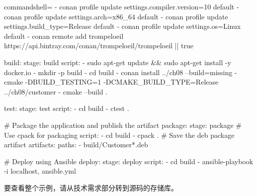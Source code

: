 \begin{tcblisting}{commandshell={}}
    - conan profile update settings.compiler.version=10 default
    - conan profile update settings.arch=x86_64 default
    - conan profile update settings.build_type=Release default
    - conan profile update settings.os=Linux default
    - conan remote add trompeloeil
https://api.bintray.com/conan/trompeloeil/trompeloeil || true

build:
  stage: build
  script:
    - sudo apt-get update && sudo apt-get install -y docker.io
    - mkdir -p build
    - cd build
    - conan install ../ch08 --build=missing
    - cmake -DBUILD_TESTING=1 -DCMAKE_BUILD_TYPE=Release ../ch08/customer
    - cmake --build .

test:
  stage: test
  script:
    - cd build
    - ctest .
    
# Package the application and publish the artifact
package:
  stage: package
  # Use cpack for packaging
  script:
    - cd build
    - cpack .
# Save the deb package artifact
artifacts:
  paths:
    - build/Customer*.deb

# Deploy using Ansible
deploy:
  stage: deploy
  script:
    - cd build
    - ansible-playbook -i localhost, ansible.yml
\end{tcblisting}

要查看整个示例，请从技术需求部分转到源码的存储库。
